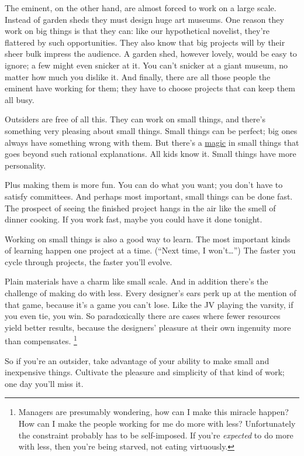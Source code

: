The eminent, on the other hand, are almost forced to work on a large
scale. Instead of garden sheds they must design huge art museums. One
reason they work on big things is that they can: like our hypothetical
novelist, they're flattered by such opportunities. They also know that
big projects will by their sheer bulk impress the audience. A garden
shed, however lovely, would be easy to ignore; a few might even snicker
at it. You can't snicker at a giant museum, no matter how much you
dislike it. And finally, there are all those people the eminent have
working for them; they have to choose projects that can keep them all
busy.

Outsiders are free of all this. They can work on small things, and
there's something very pleasing about small things. Small things can be
perfect; big ones always have something wrong with them. But there's a
\href{isetta.html}{magic} in small things that goes beyond such rational
explanations. All kids know it. Small things have more personality.

Plus making them is more fun. You can do what you want; you don't have
to satisfy committees. And perhaps most important, small things can be
done fast. The prospect of seeing the finished project hangs in the air
like the smell of dinner cooking. If you work fast, maybe you could have
it done tonight.

Working on small things is also a good way to learn. The most important
kinds of learning happen one project at a time. (``Next time, I
won't\ldots{}'') The faster you cycle through projects, the faster
you'll evolve.

Plain materials have a charm like small scale. And in addition there's
the challenge of making do with less. Every designer's ears perk up at
the mention of that game, because it's a game you can't lose. Like the
JV playing the varsity, if you even tie, you win. So paradoxically there
are cases where fewer resources yield better results, because the
designers' pleasure at their own ingenuity more than compensates.
\footnote{Managers are presumably wondering, how can I make this miracle
happen? How can I make the people working for me do more with less?
Unfortunately the constraint probably has to be self-imposed. If you're
\emph{expected} to do more with less, then you're being starved, not
eating virtuously.}

So if you're an outsider, take advantage of your ability to make small
and inexpensive things. Cultivate the pleasure and simplicity of that
kind of work; one day you'll miss it.

